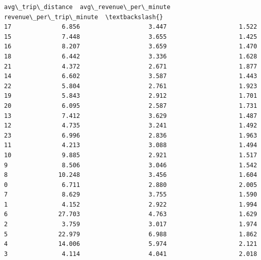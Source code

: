 \documentclass[11pt]{article}
\begin{document}
\begin{Verbatim}[commandchars=\\\{\}]
    avg\_trip\_distance  avg\_revenue\_per\_minute  revenue\_per\_trip\_minute  \textbackslash{}
17              6.856                   3.447                    1.522
15              7.448                   3.655                    1.425
16              8.207                   3.659                    1.470
18              6.442                   3.336                    1.628
21              4.372                   2.671                    1.877
14              6.602                   3.587                    1.443
22              5.804                   2.761                    1.923
19              5.843                   2.912                    1.701
20              6.095                   2.587                    1.731
13              7.412                   3.629                    1.487
12              4.735                   3.241                    1.492
23              6.996                   2.836                    1.963
11              4.213                   3.088                    1.494
10              9.885                   2.921                    1.517
9               8.506                   3.046                    1.542
8              10.248                   3.456                    1.604
0               6.711                   2.880                    2.005
7               8.629                   3.755                    1.590
1               4.152                   2.922                    1.994
6              27.703                   4.763                    1.629
2               3.759                   3.017                    1.974
5              22.979                   6.988                    1.862
4              14.006                   5.974                    2.121
3               4.114                   4.041                    2.018


\end{Verbatim}
\end{document}
